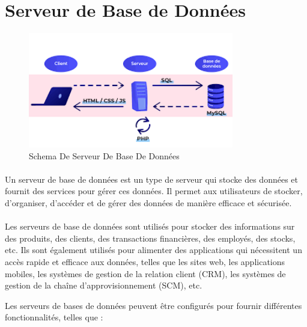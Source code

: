 \section{Serveur de Base de Données }
	\begin{figure}[h]
		\begin{center}
			
		
		
		
	\includegraphics[width=0.8\textwidth]{PhotoMemoire/serveur_bdd.png}
\caption{Schema De Serveur De Base De Données}
\end{center}
\end{figure}
\paragraph{ }
Un serveur de base de données est un type de serveur qui stocke des données et fournit des services pour gérer ces données. Il permet aux utilisateurs de stocker, d'organiser, d'accéder et de gérer des données de manière efficace et sécurisée.
\paragraph{ }
Les serveurs de base de données sont utilisés pour stocker des informations sur des produits, des clients, des transactions financières, des employés, des stocks, etc. Ils sont également utilisés pour alimenter des applications qui nécessitent un accès rapide et efficace aux données, telles que les sites web, les applications mobiles, les systèmes de gestion de la relation client (CRM), les systèmes de gestion de la chaîne d'approvisionnement (SCM), etc.

Les serveurs de bases de données peuvent être configurés pour fournir différentes fonctionnalités, telles que :

